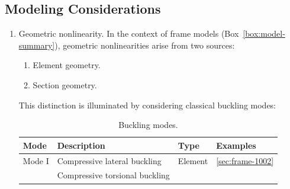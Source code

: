 \subsection{Modeling Considerations}
\begin{enumerate}
    \item Geometric nonlinearity. 
    In the context of frame models (Box~\ref{box:model-summary}), geometric nonlinearities arise from two sources:
      \begin{enumerate}
        \item Element geometry.
        \item Section geometry.
      \end{enumerate}
      This distinction is illuminated by considering classical buckling modes:
      \begin{table}[H]
          \centering
          \caption{Buckling modes.}
          \begin{tabular}{llll}
              \toprule
              Mode & Description & Type & Examples \\
              \midrule
              Mode I 
              & Compressive lateral buckling
              & Element & \ref{sec:frame-1002} 
              \\
              
              & Compressive torsional buckling
               & 
               \\ 


\end{tabular}
\end{table}
\end{enumerate}
